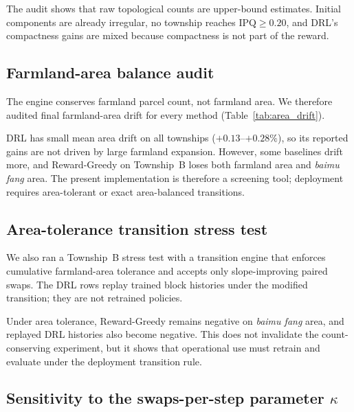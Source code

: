 \documentclass[preprint,12pt]{elsarticle}
\begin{document}


The audit shows that raw topological counts are upper-bound estimates. Initial components are already irregular, no township reaches $\mathrm{IPQ}\geq0.20$, and DRL's compactness gains are mixed because compactness is not part of the reward.

\subsection{Farmland-area balance audit}
\label{sec:area_drift}

The engine conserves farmland parcel count, not farmland area. We therefore audited final farmland-area drift for every method (Table~\ref{tab:area_drift}).



DRL has small mean area drift on all townships ($+0.13$--$+0.28\%$), so its reported gains are not driven by large farmland expansion. However, some baselines drift more, and Reward-Greedy on Township~B loses both farmland area and \textit{baimu fang} area. The present implementation is therefore a screening tool; deployment requires area-tolerant or exact area-balanced transitions.

\subsection{Area-tolerance transition stress test}
\label{sec:area_tolerance}

We also ran a Township~B stress test with a transition engine that enforces cumulative farmland-area tolerance and accepts only slope-improving paired swaps. The DRL rows replay trained block histories under the modified transition; they are not retrained policies.



Under area tolerance, Reward-Greedy remains negative on \textit{baimu fang} area, and replayed DRL histories also become negative. This does not invalidate the count-conserving experiment, but it shows that operational use must retrain and evaluate under the deployment transition rule.

\subsection{Sensitivity to the swaps-per-step parameter \texorpdfstring{$\kappa$}{kappa}}
\label{sec:kappa_ablation}
\end{document}
